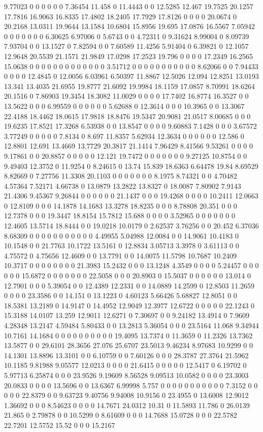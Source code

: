 9.77023 0 0 0 0 0 0 7.36454 11.458 0 11.4443 0 0 12.5285 12.467 19.7525 20.1257 17.7816 16.9063 16.8335 17.4802 18.2405 17.7929 17.8126 0 0 0 0 20.0674 0 20.2168 13.0311 19.9644 13.1584 10.6804 15.8956 19.695 17.0876 16.5567 7.05942 0 0 0 0 0 0 0 6.30625 6.97006 0 5.6743 0 0 4.72311 0 9.31624 8.99004 0 8.09739 7.93704 0 0 13.1527 0 7.82594 0 0 7.60589 11.4256 5.91404 0 6.39821 0 12.1057 12.9648 20.5539 21.1571 21.9849 17.0298 17.2523 19.796 0 0 0 0 17.2349 16.2565 15.0638 0 0 0 0 0 0 0 0 0 0 0 0 0 3.51712 0 0 0 0 0 0 0 0 0 0 0 8.62066 0 0 7.94433 0 0 0 0 12.4845 0 12.0056 6.03961 6.50397 11.8867 12.5026 12.094 12.8251 13.0193 13.341 13.4035 21.6955 19.8777 21.6092 19.9984 18.1159 17.0857 8.70991 18.6264 20.1516 0 7.86903 19.3454 18.3082 11.0029 0 0 0 0 17.7402 16.8774 16.3527 0 0 13.5622 0 0 0 6.99559 0 0 0 0 0 0 5.62688 0 12.3614 0 0 0 10.3965 0 0 13.3067 22.4188 18.4462 18.0615 17.9818 18.8476 19.5347 20.9081 21.0517 8.00685 0 0 0 19.6235 17.8521 17.3268 6.53938 0 0 13.8547 0 0 0 0 9.60883 7.1428 0 0 0 3.67572 3.77249 0 0 0 0 0 7.8134 0 8.697 11.8357 5.62934 12.3634 0 0 0 0 0 0 12.586 0 12.8801 12.691 13.4669 13.7729 20.3817 21.1414 7.96429 8.41566 9.53261 0 0 0 0 9.17861 0 0 20.8857 0 0 0 0 0 12.121 19.7472 0 0 0 0 0 0 0 9.27125 10.8754 0 0 9.49403 12.3752 0 11.9254 0 8.24615 0 13.74 15.839 18.6363 6.64478 19.84 8.69529 8.82669 0 7.27756 11.3308 20.1103 0 0 0 0 0 0 0 8.1975 8.74321 0 0 4.70482 4.57364 7.52171 4.66738 0 13.0879 13.2822 13.8327 0 18.0087 7.80902 7.9143 21.4306 9.45367 9.26844 0 0 0 0 0 0 21.1437 0 0 0 19.4268 0 0 0 0 10.2411 12.0663 0 12.8109 0 0 0 14.1878 14.1683 13.3278 18.8235 0 0 0 8.78808 20.351 0 0 0 12.7378 0 0 0 19.3447 18.8154 15.7812 15.688 0 0 0 0 3.52965 0 0 0 0 0 0 0 12.4605 13.5714 18.8444 0 0 19.0218 10.0179 0 2.62537 3.76256 0 0 20.452 6.37036 8.68309 0 0 0 0 0 0 0 0 0 0 0 4.49955 5.04988 12.0084 0 0 14.9061 10.4183 0 10.1548 0 0 21.7763 10.1722 13.5161 0 12.8834 3.05713 3.3978 0 3.61113 0 0 4.75572 0 4.75656 12.4609 0 0 13.7791 0 0 14.0075 11.5798 10.7687 10.2409 10.3717 0 0 0 0 0 0 0 0 21.3983 15.2432 0 0 0 13.1248 4.3549 0 0 0 0 5.24457 0 0 0 0 0 0 15.6872 0 0 0 0 0 0 0 22.5058 0 0 0 20.8903 0 15.5037 0 0 0 0 0 0 13.014 0 12.7901 0 0 0 5.39054 0 0 12.4389 12.2331 0 0 14.0889 14.2599 0 12.8503 11.2659 0 0 0 0 23.3586 0 0 14.151 0 13.1223 0 4.60123 5.66426 5.68827 12.8051 0 0 18.5381 13.2189 0 14.9147 0 14.4952 12.9049 12.3977 12.6722 0 0 0 0 0 22.1243 0 15.3188 14.0107 13.259 12.9011 12.6271 0 7.30697 0 0 9.24182 13.4914 0 7.9609 4.28348 13.2147 4.59484 5.80433 0 0 13.2813 5.36054 0 0 0 23.5164 11.068 9.34944 10.7161 14.1684 0 0 0 0 0 0 0 0 0 0 19.4095 13.7374 0 11.3659 0 11.2326 13.7362 13.5877 0 0 29.6101 28.3656 27.076 25.6707 23.5013 9.46234 8.97683 10.9299 0 0 14.1301 13.8896 13.3101 0 0 6.10759 0 0 7.60126 0 0 0 28.3787 27.3764 21.5962 10.1185 9.81988 9.05577 12.0213 0 0 0 0 21.6415 0 0 0 0 0 12.5417 0 6.19702 0 5.97713 6.25874 0 0 0 23.9526 9.19609 8.56528 9.09513 10.0582 0 0 0 0 23.3003 20.0833 0 0 0 0 13.5696 0 0 13.6367 6.99998 5.757 0 0 0 0 0 0 0 0 0 0 0 7.3152 0 0 0 0 0 22.8379 0 0 9.63723 9.40756 9.94008 10.9156 0 23.4955 0 13.6008 12.9012 1.36692 0 0 0 8.54623 0 0 0 0 14.7671 24.0312 10.31 0 11.5893 11.786 0 26.0139 21.865 0 2.79878 0 0 10.5299 0 8.61609 0 0 0 14.7688 15.0728 0 0 0 22.5782 22.7201 12.5752 15.52 0 0 0 15.2167 